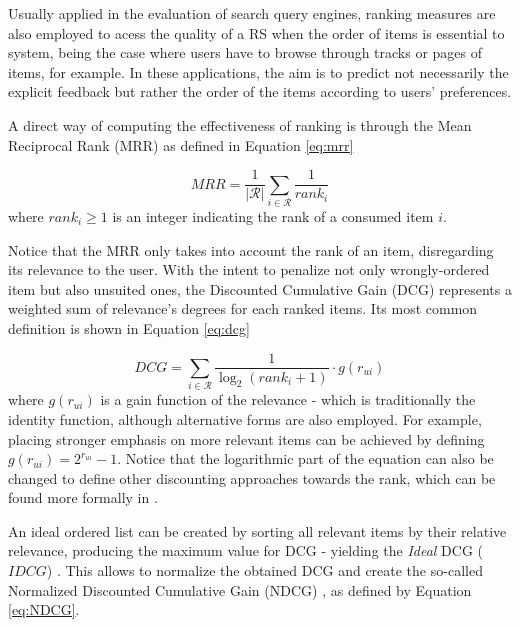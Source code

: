 Usually applied in the evaluation of search query engines, ranking measures are also employed to acess the quality of a RS when the order of items is essential to system, being the case where users have to browse through tracks or pages of items, for example. In these applications, the aim is to predict not necessarily the explicit feedback but rather the order of the items according to users' preferences. 

A direct way of computing the effectiveness of ranking is through the Mean Reciprocal Rank (MRR)  as defined in Equation \ref{eq:mrr}

\begin{equation}
\label{eq:mrr}
MRR = \frac{1}{|\mathcal{R}|}\sum_{i \in \mathcal{R}} \frac{1}{rank_i}
\end{equation} where $rank_i \geq 1$ is an integer indicating the rank of a consumed item $i$. 

Notice that the MRR only takes into account the rank of an item, disregarding its relevance to the user. With the intent to penalize not only wrongly-ordered item but also unsuited ones, the Discounted Cumulative Gain (DCG)  \cite{10.1145/582415.582418} represents a weighted sum of relevance's degrees for each ranked items. Its most common definition is shown in Equation \ref{eq:dcg}

\begin{equation}
    \label{eq:dcg}
    DCG = \sum_{i \in \mathcal{R}} \frac{1}{\log_2(rank_i+1)} \cdot g(r_{ui})
\end{equation} where $g(r_{ui})$ is a gain function of the relevance - which is traditionally the identity function, although alternative forms are also employed. For example, placing stronger emphasis on more relevant items can be achieved by defining $g(r_{ui}) = 2^{r_{ui}}-1$. Notice that the logarithmic part of the equation can also be changed to define other discounting approaches towards the rank, which can be found more formally in \cite{NDCGref}.

An ideal ordered list can be created by sorting all relevant items by their relative relevance, producing the maximum value for DCG - yielding the \textit{Ideal} DCG ($IDCG$) . This allows to normalize the obtained DCG and create the so-called Normalized Discounted Cumulative Gain (NDCG) , as defined by Equation \ref{eq:NDCG}.

